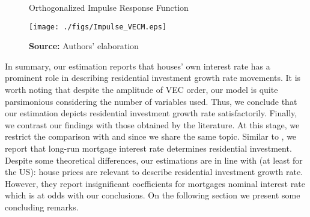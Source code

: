 \begin{figure}[H]
	\centering
	\caption{Orthogonalized Impulse Response Function}
	\label{irf}
	\texttt{[image: ./figs/Impulse\_VECM.eps]}
	\caption*{\textbf{Source:} Authors' elaboration}
\end{figure}

In summary, our estimation reports that houses' own interest rate has a prominent role in describing residential investment growth rate movements. 
It is worth noting that despite the amplitude of VEC order, our model is quite parsimonious considering the number of variables used.
Thus, we conclude that our estimation depicts residential investment growth rate satisfactorily.
Finally,  we contrast our findings with those obtained by the literature. %
At this stage, we restrict the comparison with  \textcite{gauger_residential_2003} and \textcite{arestis_residential_2015} since we share the same topic.
Similar to \textcite{gauger_residential_2003}, we report that long-run mortgage interest rate determines residential investment.
Despite some theoretical differences, our estimations are in line with \textcite{arestis_residential_2015} (at least for the US): house prices are relevant to describe residential investment growth rate.
However, they report insignificant coefficients for mortgages nominal interest rate which is at odds with our conclusions.
On the following section we present some concluding remarks.







